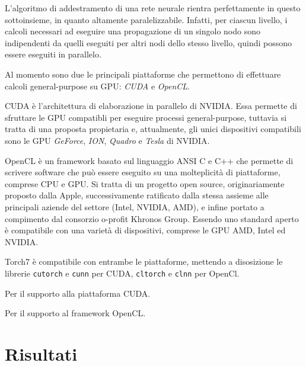 L'algoritmo di addestramento di una rete neurale rientra perfettamente in questo
sottoinsieme, in quanto altamente paralelizzabile. Infatti, per ciascun livello,
i calcoli necessari ad eseguire una propagazione di un singolo nodo sono indipendenti
da quelli eseguiti per altri nodi dello stesso livello, quindi possono essere
eseguiti in parallelo.

Al momento sono due le principali piattaforme che permettono di effettuare calcoli
general-purpose su GPU: \emph{CUDA} e \emph{OpenCL}.

CUDA \`e l'architettura di elaborazione in parallelo di NVIDIA.
Essa permette di sfruttare le GPU compatibli per eseguire processi general-purpose,
tuttavia si tratta di una proposta propietaria e, attualmente, gli unici dispositivi
compatibili sono le GPU \emph{GeForce}, \emph{ION}, \emph{Quadro} e \emph{Tesla}
di NVIDIA.

OpenCL \`e un framework basato sul linguaggio ANSI C e C++ che permette di scrivere
software che pu\`o essere eseguito su una molteplicit\`a di piattaforme, comprese
CPU e GPU. Si tratta di un progetto open source, originariamente proposto dalla
Apple, successivamente ratificato dalla stessa assieme alle principali aziende
del settore (Intel, NVIDIA, AMD), e infine portato a compimento dal consorzio
o-profit Khronos Group. Essendo uno standard aperto \`e compatibile con una
variet\`a di dispositivi, comprese le GPU AMD, Intel ed NVIDIA.

Torch7 \`e compatibile con entrambe le piattaforme, mettendo a disosizione le
librerie \texttt{cutorch} e \texttt{cunn} per CUDA, \texttt{cltorch} e \texttt{clnn}
per OpenCl.



Per il supporto alla piattaforma CUDA.



Per il supporto al framework OpenCL.

\section{Risultati}
